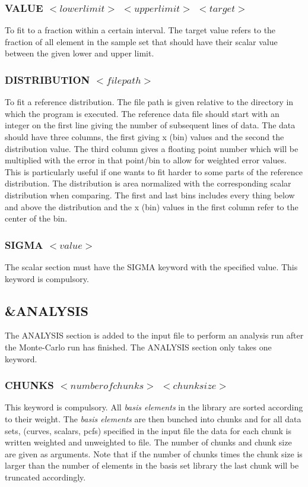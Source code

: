 \documentclass[a4paper, 10pt]{article}
\begin{document}
\subsubsection{VALUE $<lower limit>$ $<upper limit>$ $<target>$}
To fit to a fraction within a certain interval. The target value refers
to the fraction of all element in the sample set that should have their
scalar value between the given lower and upper limit.

\subsubsection{DISTRIBUTION $<file path>$}
To fit a reference distribution. The file path is given
relative to the directory in which the program is executed.
The reference data file should start with an integer on the first
line giving the number of subsequent lines of data. The data should
have three columns, the first giving x (bin) values and the second the
distribution value. The third column gives a floating point number
which will be multiplied with the error in that point/bin to allow for
weighted error values. This is particularly useful if one wants to fit
harder to some parts of the reference distribution.
The distribution is area normalized
with the corresponding scalar distribution when comparing. The first
and last bins includes every thing below and above the
distribution and the x (bin) values in the first column refer to the
center of the bin.

\subsubsection{SIGMA $<value>$}
The scalar section must have the SIGMA keyword with the specified
value. This keyword is compulsory.

\subsection{\&ANALYSIS}
\label{analysis-input}
The ANALYSIS section is added to the input file to perform an analysis
run after the Monte-Carlo run has finished. The ANALYSIS section only takes one keyword.

\subsubsection{CHUNKS $<number of chunks>$ $<chunk size>$}
This keyword is
compulsory. All {\it basis elements} in the library are sorted according to
their weight. The {\it basis elements}
are then bunched into chunks and for all data sets, (curves,
scalars, pcfs) specified in the input file the data for each chunk is
written weighted and unweighted to file. The number of chunks and
chunk size are given as arguments. Note that if the number of chunks times the
chunk size is larger than the number of elements in the basis set
library the last chunk will be truncated accordingly.
\end{document}
